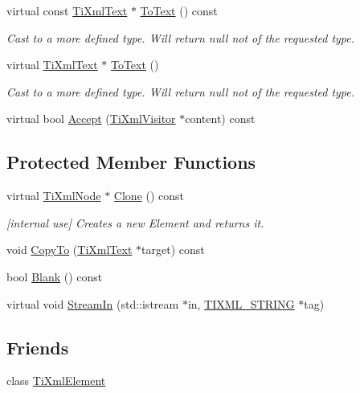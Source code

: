 \begin{DoxyCompactItemize}
virtual const \hyperlink{class_ti_xml_text}{Ti\-Xml\-Text} $\ast$ \hyperlink{class_ti_xml_text_a895bf34ffad17f7439ab2a52b9651648}{To\-Text} () const 
\begin{DoxyCompactList}\small\item\em Cast to a more defined type. Will return null not of the requested type. \end{DoxyCompactList}\item 
virtual \hyperlink{class_ti_xml_text}{Ti\-Xml\-Text} $\ast$ \hyperlink{class_ti_xml_text_ae7c3a8fd3e4dbf6c0c4363a943d72f5b}{To\-Text} ()
\begin{DoxyCompactList}\small\item\em Cast to a more defined type. Will return null not of the requested type. \end{DoxyCompactList}\item 
virtual bool \hyperlink{class_ti_xml_text_a43b9954ebf679557fac1a4453f337b7c}{Accept} (\hyperlink{class_ti_xml_visitor}{Ti\-Xml\-Visitor} $\ast$content) const 
\end{DoxyCompactItemize}
\subsection*{Protected Member Functions}
\begin{DoxyCompactItemize}
\item 
virtual \hyperlink{class_ti_xml_node}{Ti\-Xml\-Node} $\ast$ \hyperlink{class_ti_xml_text_adde1869dfb029be50713fbfd8ce4d21f}{Clone} () const 
\begin{DoxyCompactList}\small\item\em \mbox{[}internal use\mbox{]} Creates a new Element and returns it. \end{DoxyCompactList}\item 
void \hyperlink{class_ti_xml_text_adcec7d9b6fccfc5777452bb97e6031c1}{Copy\-To} (\hyperlink{class_ti_xml_text}{Ti\-Xml\-Text} $\ast$target) const 
\item 
bool \hyperlink{class_ti_xml_text_a1c120428e3b3cf24d79706e6d2b65aa6}{Blank} () const 
\item 
virtual void \hyperlink{class_ti_xml_text_a261e07cdbd5363f994371320414c17d9}{Stream\-In} (std\-::istream $\ast$in, \hyperlink{tinyxml_8h_a92bada05fd84d9a0c9a5bbe53de26887}{T\-I\-X\-M\-L\-\_\-\-S\-T\-R\-I\-N\-G} $\ast$tag)
\end{DoxyCompactItemize}
\subsection*{Friends}
\begin{DoxyCompactItemize}
\item 
class \hyperlink{class_ti_xml_text_ab6592e32cb9132be517cc12a70564c4b}{Ti\-Xml\-Element}
\end{DoxyCompactItemize}
